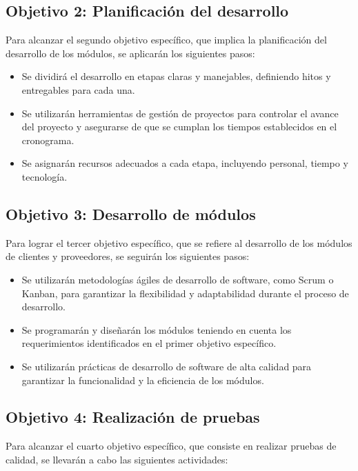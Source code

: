 \documentclass{article}
\begin{document}
\subsection{Objetivo 2: Planificación del desarrollo}

Para alcanzar el segundo objetivo específico, que implica la planificación del desarrollo de los módulos, se aplicarán los siguientes pasos:

\begin{itemize}
    \item Se dividirá el desarrollo en etapas claras y manejables, definiendo hitos y entregables para cada una.
    \item Se utilizarán herramientas de gestión de proyectos para controlar el avance del proyecto y asegurarse de que se cumplan los tiempos establecidos en el cronograma.
    \item Se asignarán recursos adecuados a cada etapa, incluyendo personal, tiempo y tecnología.
\end{itemize}

\subsection{Objetivo 3: Desarrollo de módulos}

Para lograr el tercer objetivo específico, que se refiere al desarrollo de los módulos de clientes y proveedores, se seguirán los siguientes pasos:

\begin{itemize}
    \item Se utilizarán metodologías ágiles de desarrollo de software, como Scrum o Kanban, para garantizar la flexibilidad y adaptabilidad durante el proceso de desarrollo.
    \item Se programarán y diseñarán los módulos teniendo en cuenta los requerimientos identificados en el primer objetivo específico.
    \item Se utilizarán prácticas de desarrollo de software de alta calidad para garantizar la funcionalidad y la eficiencia de los módulos.
\end{itemize}

\subsection{Objetivo 4: Realización de pruebas}

Para alcanzar el cuarto objetivo específico, que consiste en realizar pruebas de calidad, se llevarán a cabo las siguientes actividades:
\end{document}
